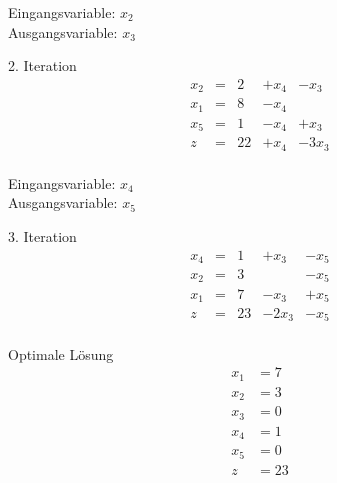 \documentclass[a4paper]{scrartcl}
\begin{document}
\begin{enumerate}[label=\bfseries\arabic*.]
\begin{enumerate}
\begin{enumerate}[(i)]
\begin{enumerate}
                                Eingangsvariable: $x_2$ \\
                                Ausgangsvariable: $x_3$

                                2. Iteration
                                \begin{equation}
                                    \begin{array}{rcrrr}
                                        x_2 & = & 2 & +x_4 & -x_3 \\
                                        x_1 & = & 8 & -x_4 &  \\
                                        x_5 & = & 1 & -x_4 & +x_3 \\
                                        \hline
                                        z   & = & 22 & +x_4 & -3x_3 \\
                                    \end{array}
                                \end{equation}

                                Eingangsvariable: $x_4$ \\
                                Ausgangsvariable: $x_5$

                                3. Iteration
                                \begin{equation}
                                    \begin{array}{rcrrr}
                                        x_4 & = & 1 & +x_3 & -x_5 \\
                                        x_2 & = & 3 &  & -x_5 \\
                                        x_1 & = & 7 & -x_3 & +x_5 \\
                                        \hline
                                        z   & = & 23 & -2x_3 & -x_5 \\
                                    \end{array}
                                \end{equation}

                                Optimale Lösung
                                \begin{align*}
                                    x_1 &= 7 \\
                                    x_2 &= 3 \\
                                    x_3 &= 0 \\
                                    x_4 &= 1 \\
                                    x_5 &= 0 \\
                                    z   &= 23
                                \end{align*}


\end{enumerate}
\end{enumerate}
\end{enumerate}
\end{enumerate}
\end{document}
